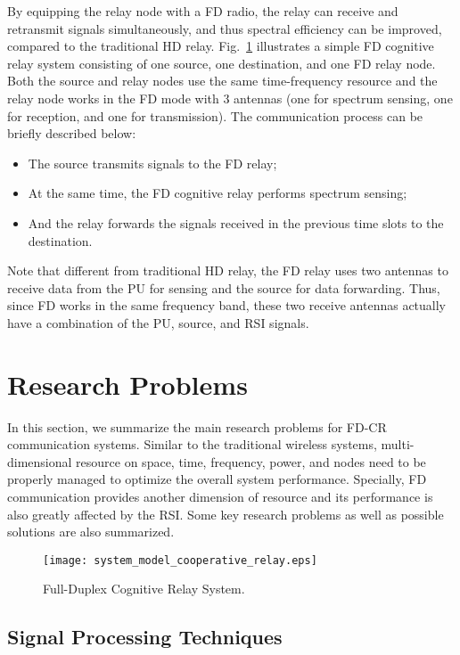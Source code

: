 \documentclass[onecolumn,12pt]{IEEEtran}
\begin{document}
By equipping the relay node with a FD radio, the relay can receive and retransmit signals simultaneously, and thus spectral efficiency can be improved, compared to the traditional HD relay. Fig.~\ref{relay} illustrates a simple FD cognitive relay system consisting of one source, one destination, and one FD relay node. Both the source and relay nodes use the same time-frequency resource and the relay node works in the FD mode with 3 antennas (one for spectrum sensing, one for reception, and one for transmission). The communication process can be briefly described below:
\begin{itemize}
  \item The source transmits signals to the FD relay;
  \item At the same time, the FD cognitive relay performs spectrum sensing;
  \item And the relay forwards the signals received in the previous time slots to the destination.
\end{itemize}
Note that different from traditional HD relay, the FD relay uses two antennas to receive data from the PU for sensing and the source for data forwarding. Thus, since FD works in the same frequency band, these two receive antennas actually have a combination of the PU, source, and RSI signals.



\section{Research Problems}

In this section, we summarize the main research problems for FD-CR communication systems. Similar to the traditional wireless systems, multi-dimensional resource on space, time, frequency, power, and nodes need to be properly managed to optimize the overall system performance. Specially, FD communication provides another dimension of resource and its performance is also greatly affected by the RSI. Some key research problems as well as possible solutions are also summarized.

\begin{figure}[h!]
\centering
\texttt{[image: system\_model\_cooperative\_relay.eps]}
\caption{{Full-Duplex Cognitive Relay System.}}\label{relay}
\end{figure}

\subsection{Signal Processing Techniques}
\end{document}
